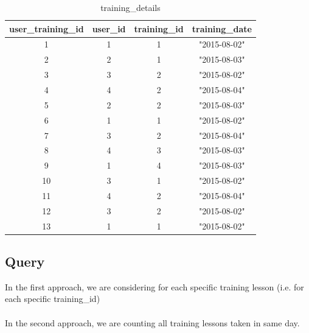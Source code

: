\documentclass[12pt]{article}
\begin{document}
\vspace{10mm}
\begin{table}[!hbt]
    \centering
    \begin{tabular}{|c|c|c|c|} 
        \hline
        \textbf{user\_training\_id} & \textbf{user\_id} & \textbf{training\_id} & \textbf{training\_date} \\ 
        \hline\hline
        1 & 1 & 1 & "2015-08-02" \\ 
        \hline
        2 & 2 & 1 & "2015-08-03" \\
        \hline
        3 & 3 & 2 & "2015-08-02" \\
        \hline
        4 & 4 & 2 & "2015-08-04" \\
        \hline
        5 & 2 & 2 & "2015-08-03" \\
        \hline
        6 & 1 & 1 & "2015-08-02" \\
        \hline
        7 & 3 & 2 & "2015-08-04" \\
        \hline
        8 & 4 & 3 & "2015-08-03" \\
        \hline
        9 & 1 & 4 & "2015-08-03" \\
        \hline
        10 & 3 & 1 & "2015-08-02" \\
        \hline
        11 & 4 & 2 & "2015-08-04" \\
        \hline
        12 & 3 & 2 & "2015-08-02" \\
        \hline
        13 & 1 & 1 & "2015-08-02" \\
        \hline
    \end{tabular}
    \caption{training\_details}
    \label{tab:my_label}
\end{table}

\newpage

\subsection{Query}
In the first approach, we are considering for each specific training lesson (i.e. for each specific training\_id)
\vspace{5mm} \\
\vspace{1.2cm} \\
In the second approach, we are counting all training lessons taken in same day.
\vspace{5mm} \\
\end{document}
